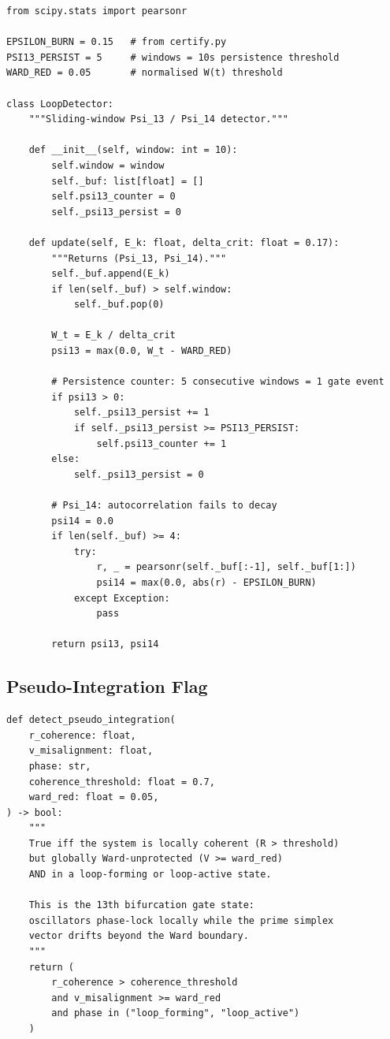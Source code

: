 \documentclass[12pt,a4paper]{article}
\theoremstyle{plain}
\theoremstyle{definition}
\begin{document}
\begin{lstlisting}[style=orfpython, caption={Gap 3 --- Phase-2 loop detector (\texttt{phase2\_loop\_detector.py})}]
from scipy.stats import pearsonr

EPSILON_BURN = 0.15   # from certify.py
PSI13_PERSIST = 5     # windows = 10s persistence threshold
WARD_RED = 0.05       # normalised W(t) threshold

class LoopDetector:
    """Sliding-window Psi_13 / Psi_14 detector."""

    def __init__(self, window: int = 10):
        self.window = window
        self._buf: list[float] = []
        self.psi13_counter = 0
        self._psi13_persist = 0

    def update(self, E_k: float, delta_crit: float = 0.17):
        """Returns (Psi_13, Psi_14)."""
        self._buf.append(E_k)
        if len(self._buf) > self.window:
            self._buf.pop(0)

        W_t = E_k / delta_crit
        psi13 = max(0.0, W_t - WARD_RED)

        # Persistence counter: 5 consecutive windows = 1 gate event
        if psi13 > 0:
            self._psi13_persist += 1
            if self._psi13_persist >= PSI13_PERSIST:
                self.psi13_counter += 1
        else:
            self._psi13_persist = 0

        # Psi_14: autocorrelation fails to decay
        psi14 = 0.0
        if len(self._buf) >= 4:
            try:
                r, _ = pearsonr(self._buf[:-1], self._buf[1:])
                psi14 = max(0.0, abs(r) - EPSILON_BURN)
            except Exception:
                pass

        return psi13, psi14
\end{lstlisting}

\subsection{Pseudo-Integration Flag}
\label{sec:code:pi}

\begin{lstlisting}[style=orfpython, caption={Pseudo-integration diagnostic (added to \texttt{pipeline.py})}]
def detect_pseudo_integration(
    r_coherence: float,
    v_misalignment: float,
    phase: str,
    coherence_threshold: float = 0.7,
    ward_red: float = 0.05,
) -> bool:
    """
    True iff the system is locally coherent (R > threshold)
    but globally Ward-unprotected (V >= ward_red)
    AND in a loop-forming or loop-active state.

    This is the 13th bifurcation gate state:
    oscillators phase-lock locally while the prime simplex
    vector drifts beyond the Ward boundary.
    """
    return (
        r_coherence > coherence_threshold
        and v_misalignment >= ward_red
        and phase in ("loop_forming", "loop_active")
    )
\end{lstlisting}
\end{document}
